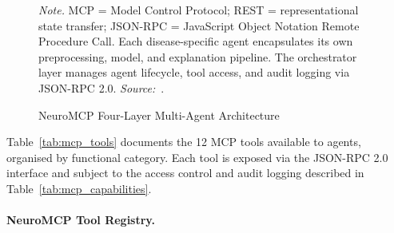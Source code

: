 \begin{figure}[!htbp]
{%
}
\caption{NeuroMCP Four-Layer Multi-Agent Architecture}
\label{fig:neuromcp_layers}
\vspace{0.5em}\noindent\textit{Note.} MCP = Model Control Protocol; REST = representational state transfer; JSON-RPC = JavaScript Object Notation Remote Procedure Call. Each disease-specific agent encapsulates its own preprocessing, model, and explanation pipeline. The orchestrator layer manages agent lifecycle, tool access, and audit logging via JSON-RPC 2.0. \textit{Source:}~\cite{asthana2025eegmaster}.
\end{figure}
\fi

Table~\ref{tab:mcp_tools} documents the 12 MCP tools available to agents, organised by functional category. Each tool is exposed via the JSON-RPC 2.0 interface and subject to the access control and audit logging described in Table~\ref{tab:mcp_capabilities}.

\paragraph{NeuroMCP Tool Registry.}


